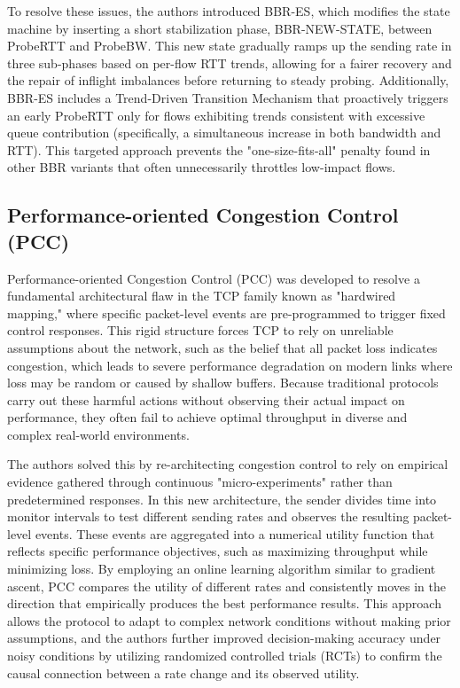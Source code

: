 To resolve these issues, the authors introduced BBR-ES, which modifies the state machine by inserting a short stabilization phase, BBR-NEW-STATE, between ProbeRTT and ProbeBW\cite{BBRES}. 
This new state gradually ramps up the sending rate in three sub-phases based on per-flow RTT trends, allowing for a fairer recovery and the repair of inflight imbalances before returning to steady probing\cite{BBRES}. 
Additionally, BBR-ES includes a Trend-Driven Transition Mechanism that proactively triggers an early ProbeRTT only for flows exhibiting trends consistent with excessive queue contribution (specifically, a simultaneous increase in both bandwidth and RTT)\cite{BBRES}. 
This targeted approach prevents the "one-size-fits-all" penalty found in other BBR variants that often unnecessarily throttles low-impact flows\cite{BBRES}.

\subsection{Performance-oriented Congestion Control (PCC)}

Performance-oriented Congestion Control (PCC) was developed to resolve a fundamental architectural flaw in the TCP family known as "hardwired mapping," where specific packet-level events are pre-programmed to trigger fixed control responses\cite{PCC}. 
This rigid structure forces TCP to rely on unreliable assumptions about the network, such as the belief that all packet loss indicates congestion, which leads to severe performance degradation on modern links where loss may be random or caused by shallow buffers\cite{PCC}.
Because traditional protocols carry out these harmful actions without observing their actual impact on performance, they often fail to achieve optimal throughput in diverse and complex real-world environments\cite{PCC}.

The authors solved this by re-architecting congestion control to rely on empirical evidence gathered through continuous "micro-experiments" rather than predetermined responses\cite{PCC}. 
In this new architecture, the sender divides time into monitor intervals to test different sending rates and observes the resulting packet-level events\cite{PCC}. 
These events are aggregated into a numerical utility function that reflects specific performance objectives, such as maximizing throughput while minimizing loss. By employing an online learning algorithm similar to gradient ascent, PCC compares the utility of different rates and consistently moves in the direction that empirically produces the best performance results\cite{PCC}. 
This approach allows the protocol to adapt to complex network conditions without making prior assumptions, and the authors further improved decision-making accuracy under noisy conditions by utilizing randomized controlled trials (RCTs) to confirm the causal connection between a rate change and its observed utility\cite{PCC}.

